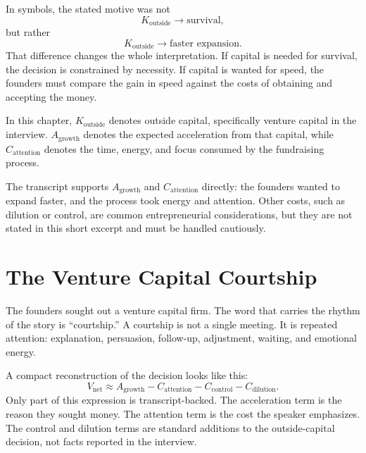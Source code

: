 In symbols, the stated motive was not
\begin{equation}
K_{\mathrm{outside}} \rightarrow \text{survival},
\end{equation}
but rather
\begin{equation}
K_{\mathrm{outside}} \rightarrow \text{faster expansion}.
\end{equation}
That difference changes the whole interpretation. If capital is needed for survival, the decision is constrained by necessity. If capital is wanted for speed, the founders must compare the gain in speed against the costs of obtaining and accepting the money.

\begin{definition}
In this chapter, \(K_{\mathrm{outside}}\) denotes outside capital, specifically venture capital in the interview. \(A_{\mathrm{growth}}\) denotes the expected acceleration from that capital, while \(C_{\mathrm{attention}}\) denotes the time, energy, and focus consumed by the fundraising process.
\end{definition}

The transcript supports \(A_{\mathrm{growth}}\) and \(C_{\mathrm{attention}}\) directly: the founders wanted to expand faster, and the process took energy and attention. Other costs, such as dilution or control, are common entrepreneurial considerations, but they are not stated in this short excerpt and must be handled cautiously.

\section{The Venture Capital Courtship}

The founders sought out a venture capital firm. The word that carries the rhythm of the story is ``courtship.'' A courtship is not a single meeting. It is repeated attention: explanation, persuasion, follow-up, adjustment, waiting, and emotional energy.

A compact reconstruction of the decision looks like this:
\begin{equation}
V_{\mathrm{net}}
\approx
A_{\mathrm{growth}}
-
C_{\mathrm{attention}}
-
C_{\mathrm{control}}
-
C_{\mathrm{dilution}} .
\end{equation}
Only part of this expression is transcript-backed. The acceleration term is the reason they sought money. The attention term is the cost the speaker emphasizes. The control and dilution terms are standard additions to the outside-capital decision, not facts reported in the interview.

